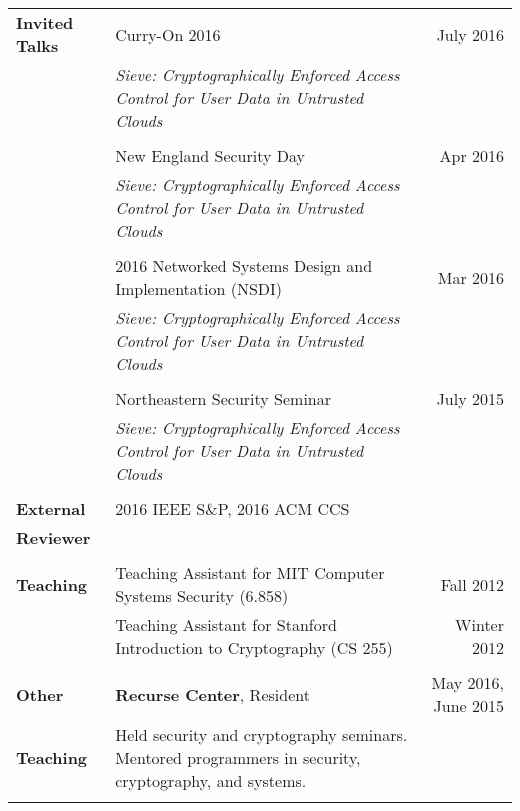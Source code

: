 \documentclass[a4paper,10pt]{article}
\begin{document}
\begin{tabular*}{0.95 \textwidth} { p{0.9in} l @{\extracolsep{\fill}} r}

\textbf{Invited Talks} & Curry-On 2016 & July 2016 \\
& \begin{minipage}[t]{0.6 \textwidth} 
\textit{Sieve: Cryptographically Enforced Access Control for User Data in Untrusted Clouds} \end{minipage} & \\ \\
& New England Security Day & Apr 2016 \\
& \begin{minipage}[t]{0.6 \textwidth}
\textit{Sieve: Cryptographically Enforced Access Control for User Data in Untrusted Clouds} \end{minipage} & \\ \\
& 2016 Networked Systems Design and Implementation (NSDI) & Mar 2016 \\
& \begin{minipage}[t]{0.6 \textwidth} 
\textit{Sieve: Cryptographically Enforced Access Control for User Data in Untrusted Clouds} \end{minipage} & \\ \\
& Northeastern Security Seminar & July 2015 \\
& \begin{minipage}[t]{0.6 \textwidth} \textit{Sieve: Cryptographically Enforced Access Control for User Data in Untrusted Clouds} \end{minipage} & \\ \\

\textbf{External} & 2016 IEEE S\&P, 2016 ACM CCS & \\
\textbf{Reviewer} & & \\ \\

\textbf{Teaching} 
& Teaching Assistant for MIT Computer Systems Security (6.858) & Fall 2012 \\
& Teaching Assistant for Stanford Introduction to Cryptography (CS 255) & Winter 2012 \\ \\

\textbf{Other} & \textbf{Recurse Center}, Resident & May 2016, June 2015 \\ 
\textbf{Teaching} & \begin{minipage}[t]{0.5 \textwidth} 
Held security and cryptography seminars. Mentored programmers 
in security, cryptography, and systems. 
\end{minipage} \\ \\


\end{tabular*}
\end{document}
